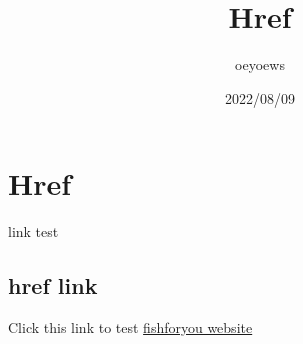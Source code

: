 \documentclass{article}
\title{Href}
\author{oeyoews}
\date{2022/08/09}
\begin{document}
\maketitle

\newpage

\section{Href}

link test

\subsection{href link}%

Click this link to test
\href{https://oeyoew.fun}{fishforyou website}
\end{document}
